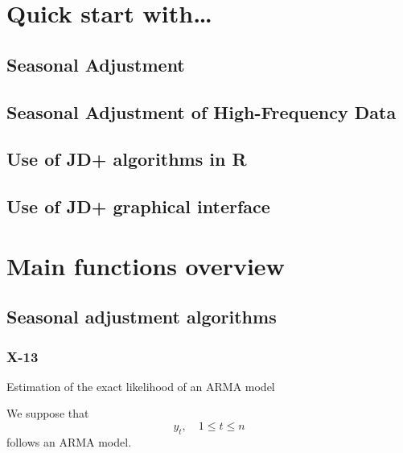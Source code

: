 \documentclass[
]{book}
\begin{document}
\hypertarget{quick-start-with}{%
\chapter{Quick start with\ldots{}}\label{quick-start-with}}

\hypertarget{seasonal-adjustment}{%
\section{Seasonal Adjustment}\label{seasonal-adjustment}}

\hypertarget{seasonal-adjustment-of-high-frequency-data}{%
\section{Seasonal Adjustment of High-Frequency Data}\label{seasonal-adjustment-of-high-frequency-data}}

\hypertarget{use-of-jd-algorithms-in-r}{%
\section{Use of JD+ algorithms in R}\label{use-of-jd-algorithms-in-r}}

\hypertarget{use-of-jd-graphical-interface}{%
\section{Use of JD+ graphical interface}\label{use-of-jd-graphical-interface}}

\hypertarget{main-functions-overview}{%
\chapter{Main functions overview}\label{main-functions-overview}}

\hypertarget{seasonal-adjustment-algorithms}{%
\section{Seasonal adjustment algorithms}\label{seasonal-adjustment-algorithms}}

\hypertarget{x-13}{%
\subsection{X-13}\label{x-13}}

Estimation of the exact likelihood of an ARMA model

We suppose that
\[ y_t, \quad 1 \le t \le n \]
follows an ARMA model.
\end{document}
